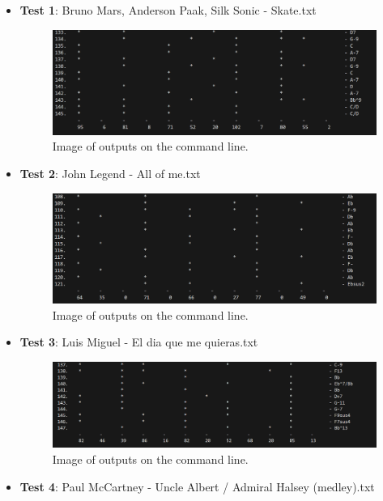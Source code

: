 \documentclass{article}
\begin{document}
\begin{itemize}
    \item \textbf{Test 1}: Bruno Mars, Anderson Paak, Silk Sonic - Skate.txt
    \begin{figure}[H]
        \centering
        \includegraphics[width=1\textwidth]{Image_SkateParsed.png}
        \caption{Image of outputs on the command line.}
    \end{figure}
    \item \textbf{Test 2}: John Legend - All of me.txt
    \begin{figure}[H]
        \centering
        \includegraphics[width=1\textwidth]{Image_AllOfMeParsed.png}
        \caption{Image of outputs on the command line.}
    \end{figure}
    \item \textbf{Test 3}: Luis Miguel - El dia que me quieras.txt
    \begin{figure}[H]
        \centering
        \includegraphics[width=1\textwidth]{Image_ElDiaQueMeQuiera.png}
        \caption{Image of outputs on the command line.}
    \end{figure}
    \item \textbf{Test 4}: Paul McCartney - Uncle Albert / Admiral Halsey (medley).txt
    \begin{figure}[H]

\end{figure}
\end{itemize}
\end{document}

